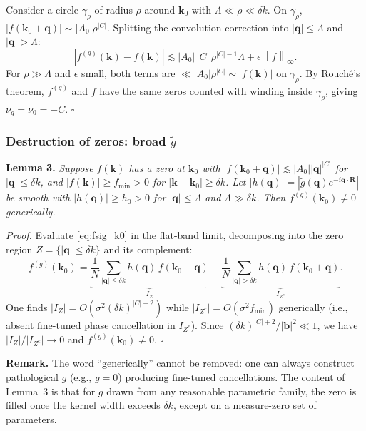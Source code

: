 \documentclass[aps,prb,onecolumn,nofootinbib,superscriptaddress]{revtex4-2}
\newcommand{\mbf}[1]{\mathbf{#1}}
\newcommand{\norm}[1]{\left\lVert#1\right\rVert}
\begin{document}
Consider a circle $\gamma_\rho$ of radius $\rho$ around $\mbf{k}_0$ with $\Lambda \ll \rho \ll \delta k$. On $\gamma_\rho$, $|f(\mbf{k}_0 + \mbf{q})| \sim |A_0|\rho^{|C|}$. Splitting the convolution correction into $|\mbf{q}| \leq \Lambda$ and $|\mbf{q}| > \Lambda$:
\begin{equation}
|f^{(g)}(\mbf{k}) - f(\mbf{k})| \lesssim |A_0|\,|C|\,\rho^{|C|-1}\Lambda + \epsilon\norm{f}_\infty.
\end{equation}
For $\rho \gg \Lambda$ and $\epsilon$ small, both terms are $\ll |A_0|\rho^{|C|} \sim |f(\mbf{k})|$ on $\gamma_\rho$. By Rouch\'{e}'s theorem, $f^{(g)}$ and $f$ have the same zeros counted with winding inside $\gamma_\rho$, giving $\nu_g=\nu_0=-C$. $\square$

\subsubsection{Destruction of zeros: broad $\tilde{g}$}

\noindent\textbf{Lemma 3.} \emph{Suppose $f(\mbf{k})$ has a zero at $\mbf{k}_0$ with $|f(\mbf{k}_0 + \mbf{q})| \lesssim |A_0||\mbf{q}|^{|C|}$ for $|\mbf{q}| \leq \delta k$, and $|f(\mbf{k})| \geq f_{\min} > 0$ for $|\mbf{k} - \mbf{k}_0| \geq \delta k$. Let $|h(\mbf{q})| = |\tilde{g}(\mbf{q})e^{-i\mbf{q}\cdot\mbf{R}}|$ be smooth with $|h(\mbf{q})| \geq h_0 > 0$ for $|\mbf{q}| \leq \Lambda$ and $\Lambda \gg \delta k$. Then $f^{(g)}(\mbf{k}_0) \neq 0$ generically.}

\medskip
\noindent\emph{Proof.} Evaluate \eqref{eq:fsig_k0} in the flat-band limit, decomposing into the zero region $Z = \{|\mbf{q}|\leq\delta k\}$ and its complement:
\begin{equation}\label{eq:case2_decomp}
f^{(g)}(\mbf{k}_0) = \underbrace{\frac{1}{N}\sum_{|\mbf{q}|\leq\delta k} h(\mbf{q})\,f(\mbf{k}_0+\mbf{q})}_{I_Z} + \underbrace{\frac{1}{N}\sum_{|\mbf{q}|>\delta k} h(\mbf{q})\,f(\mbf{k}_0+\mbf{q})}_{I_{Z^c}}.
\end{equation}
One finds $|I_Z| = O(\sigma^2(\delta k)^{|C|+2})$ while $|I_{Z^c}| = O(\sigma^2 f_{\min})$ generically (i.e., absent fine-tuned phase cancellation in $I_{Z^c}$). Since $(\delta k)^{|C|+2}/|\mbf{b}|^2 \ll 1$, we have $|I_Z|/|I_{Z^c}| \to 0$ and $f^{(g)}(\mbf{k}_0) \neq 0$. $\square$

\medskip
\noindent\textbf{Remark.} The word ``generically'' cannot be removed: one can always construct pathological $g$ (e.g., $g=0$) producing fine-tuned cancellations. The content of Lemma~3 is that for $g$ drawn from any reasonable parametric family, the zero is filled once the kernel width exceeds $\delta k$, except on a measure-zero set of parameters.
\end{document}
